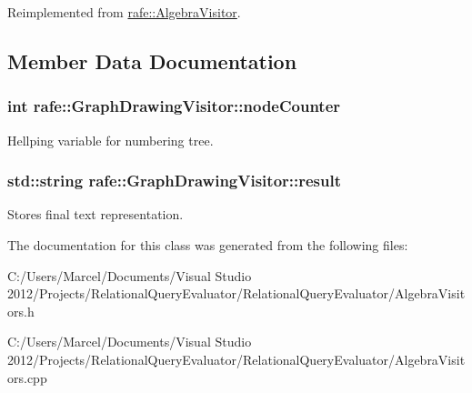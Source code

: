 Reimplemented from \hyperlink{classrafe_1_1_algebra_visitor_a1f8a7cae040f5918e562741a136bb096}{rafe\+::\+Algebra\+Visitor}.



\subsection{Member Data Documentation}
\hypertarget{classrafe_1_1_graph_drawing_visitor_a826fb63b5690180f6cf3c1f7fd0300b4}{
\subsubsection[{node\+Counter}]{\setlength{\rightskip}{0pt plus 5cm}int rafe\+::\+Graph\+Drawing\+Visitor\+::node\+Counter}}\label{classrafe_1_1_graph_drawing_visitor_a826fb63b5690180f6cf3c1f7fd0300b4}
Hellping variable for numbering tree. \hypertarget{classrafe_1_1_graph_drawing_visitor_a943dc1e93020b9adaa1ca6eff5c73bdd}{
\subsubsection[{result}]{\setlength{\rightskip}{0pt plus 5cm}std\+::string rafe\+::\+Graph\+Drawing\+Visitor\+::result}}\label{classrafe_1_1_graph_drawing_visitor_a943dc1e93020b9adaa1ca6eff5c73bdd}
Stores final text representation. 

The documentation for this class was generated from the following files\+:\begin{DoxyCompactItemize}
\item 
C\+:/\+Users/\+Marcel/\+Documents/\+Visual Studio 2012/\+Projects/\+Relational\+Query\+Evaluator/\+Relational\+Query\+Evaluator/Algebra\+Visitors.\+h\item 
C\+:/\+Users/\+Marcel/\+Documents/\+Visual Studio 2012/\+Projects/\+Relational\+Query\+Evaluator/\+Relational\+Query\+Evaluator/Algebra\+Visitors.\+cpp\end{DoxyCompactItemize}
